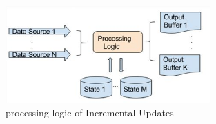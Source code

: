 \documentclass[12pt, a4paper]{article}
\begin{document}
            \begin{figure}[H]
                \centering
                \includegraphics[width=0.7\textwidth]{Images/image (6).png}
                \vspace{1em}
                \caption{processing logic of Incremental Updates}
            \end{figure}
        
\end{document}
